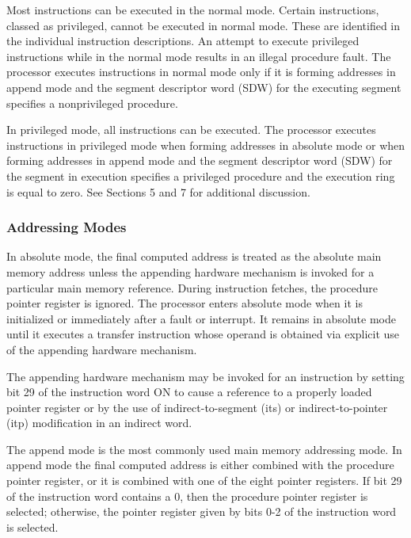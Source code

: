 

Most instructions can be executed in the normal mode. Certain instructions, classed as
privileged, cannot be executed in normal mode. These are identified in the individual instruction
descriptions. An attempt to execute privileged instructions while in the normal mode results in an
illegal procedure fault. The processor executes instructions in normal mode only if it is forming
addresses in append mode and the segment descriptor word (SDW) for the executing segment
specifies a nonprivileged procedure.



In privileged mode, all instructions can be executed. The processor executes instructions in
privileged mode when forming addresses in absolute mode or when forming addresses in append
mode and the segment descriptor word (SDW) for the segment in execution specifies a privileged
procedure and the execution ring is equal to zero. See Sections 5 and 7 for additional discussion.


\subsubsection{Addressing Modes}


In absolute mode, the final computed address is treated as the absolute main
memory address unless the appending hardware mechanism is invoked for a
particular main memory reference. During instruction fetches, the procedure
pointer register is ignored. The processor enters absolute mode when it is
initialized or immediately after a fault or interrupt. It remains in absolute
mode until it executes a transfer instruction whose operand is obtained via
explicit use of the appending hardware mechanism.

The appending hardware mechanism may be invoked for an instruction by setting
bit 29 of the instruction word ON to cause a reference to a properly loaded
pointer register or by the use of indirect-to-segment (its) or
indirect-to-pointer (itp) modification in an indirect word.  



The append mode is the most commonly used main memory addressing mode. In
append mode the final computed address is either combined with the procedure
pointer register, or it is combined with one of the eight pointer registers. If
bit 29 of the instruction word contains a 0, then the procedure pointer
register is selected; otherwise, the pointer register given by bits 0-2 of the
instruction word is selected.  

